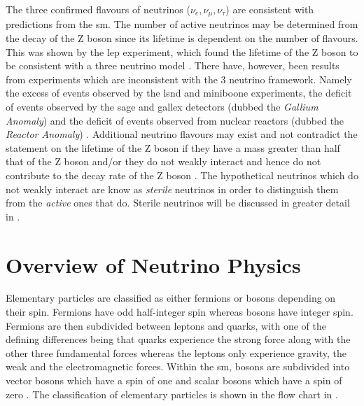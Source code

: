 The three confirmed flavours of neutrinos ($\nu_e, \nu_{\mu}, \nu_{\tau}$) are consistent with predictions from the \Gls{sm}. The number of active neutrinos may be determined from the decay of the Z boson since its lifetime is dependent on the number of flavours. This was shown by the \gls{lep} experiment, which found the lifetime of the Z boson to be consistent with a three neutrino model \cite{Zboson_number_of_neutrinos}\cite{LEP}. There have, however, been results from experiments which are inconsistent with the 3 neutrino framework. Namely the excess of events observed by the \gls{lsnd} and \gls{miniboone} experiments, the deficit of events observed by the \gls{sage} and \gls{gallex} detectors (dubbed the \textit{Gallium Anomaly}) and the deficit of events observed from nuclear reactors (dubbed the \textit{Reactor Anomaly}) \cite{LSND_excess} \cite{MiniBooNE_excess} \cite{GALLEX} \cite{Gallex_reanalysis} \cite{SAGE} \cite{Reactor_anomaly}. Additional neutrino flavours may exist and not contradict the statement on the lifetime of the Z boson if they have a mass greater than half that of the Z boson and/or they do not weakly interact and hence do not contribute to the decay rate of the Z boson \cite{Zboson_number_of_neutrinos}. The hypothetical neutrinos which do not weakly interact are know as \textit{sterile} neutrinos in order to distinguish them from the \textit{active} ones that do. Sterile neutrinos will be discussed in greater detail in .

\section{Overview of Neutrino Physics}\label{sec:neutrino_physics}

Elementary particles are classified as either fermions or bosons depending on their spin. Fermions have odd half-integer spin whereas bosons have integer spin. Fermions are then subdivided between leptons and quarks, with one of the defining differences being that quarks experience the strong force along with the other three fundamental forces whereas the leptons only experience gravity, the weak and the electromagnetic forces. Within the \gls{sm}, bosons are subdivided into vector bosons which have a spin of one and scalar bosons which have a spin of zero \cite{Particles_and_Fundamental_Interactions:_An_Introduction_to_Particle_Physics}. The classification of elementary particles is shown in the flow chart in .

